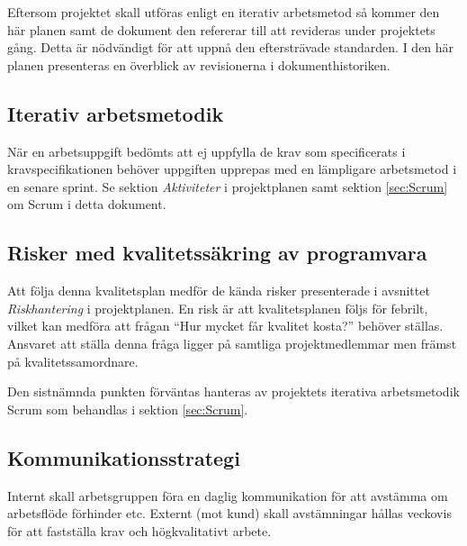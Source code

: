 \documentclass[a4paper,10pt]{article}
\begin{document}
Eftersom projektet skall utföras enligt en iterativ arbetsmetod så kommer den här planen samt de dokument den refererar till att revideras under projektets gång. Detta är nödvändigt för att uppnå den eftersträvade standarden. I den här planen presenteras en överblick av revisionerna i dokumenthistoriken.

\subsection{Iterativ arbetsmetodik}
När en arbetsuppgift bedömts att ej uppfylla de krav som specificerats i kravspecifikationen behöver uppgiften upprepas med en lämpligare arbetsmetod i en senare sprint. Se sektion \emph{Aktiviteter} i projektplanen samt sektion \ref{sec:Scrum} om Scrum i detta dokument.

\subsection{Risker med kvalitetssäkring av programvara}
Att följa denna kvalitetsplan medför de kända risker presenterade i avsnittet \emph{Riskhantering} i projektplanen. En risk är att kvalitetsplanen följs för febrilt, vilket kan medföra att frågan “Hur mycket får kvalitet kosta?” behöver ställas. Ansvaret att ställa denna fråga ligger på samtliga projektmedlemmar men främst på kvalitetssamordnare.

Den sistnämnda punkten förväntas hanteras av projektets iterativa arbetsmetodik Scrum som behandlas i sektion \ref{sec:Scrum}.

\subsection{Kommunikationsstrategi}
Internt skall arbetsgruppen föra en daglig kommunikation för att avstämma om arbetsflöde förhinder etc.
Externt (mot kund) skall avstämningar hållas veckovis för att fastställa krav och högkvalitativt arbete.
\end{document}
